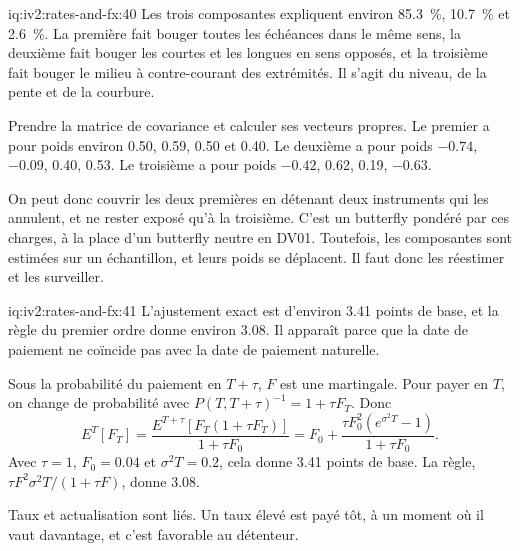 \begin{solution}{iq:iv2:rates-and-fx:40}
Les trois composantes expliquent environ 85.3~\%, 10.7~\% et 2.6~\%. La première fait bouger toutes les échéances dans le même sens, la deuxième fait bouger les courtes et les longues en sens opposés, et la troisième fait bouger le milieu à contre-courant des extrémités. Il s'agit du niveau, de la pente et de la courbure.

Prendre la matrice de covariance et calculer ses vecteurs propres. Le premier a pour poids environ 0.50, 0.59, 0.50 et 0.40. Le deuxième a pour poids $-0.74$, $-0.09$, 0.40, 0.53. Le troisième a pour poids $-0.42$, 0.62, 0.19, $-0.63$.

On peut donc couvrir les deux premières en détenant deux instruments qui les annulent, et ne rester exposé qu'à la troisième. C'est un butterfly pondéré par ces charges, à la place d'un butterfly neutre en DV01. Toutefois, les composantes sont estimées sur un échantillon, et leurs poids se déplacent. Il faut donc les réestimer et les surveiller.

\end{solution}

\begin{solution}{iq:iv2:rates-and-fx:41}
L'ajustement exact est d'environ 3.41 points de base, et la règle du premier ordre donne environ 3.08. Il apparaît parce que la date de paiement ne coïncide pas avec la date de paiement naturelle.

Sous la probabilité du paiement en $T + \tau$, $F$ est une martingale. Pour payer en $T$, on change de probabilité avec $P(T, T + \tau)^{-1} = 1 + \tau F_T$. Donc
\[
E^T[F_T] = \frac{E^{T+\tau}[F_T(1 + \tau F_T)]}{1 + \tau F_0} = F_0 + \frac{\tau F_0^2(e^{\sigma^2T} - 1)}{1 + \tau F_0}.
\]
Avec $\tau = 1$, $F_0 = 0.04$ et $\sigma^2T = 0.2$, cela donne 3.41 points de base. La règle, $\tau F^2\sigma^2T/(1 + \tau F)$, donne 3.08.

Taux et actualisation sont liés. Un taux élevé est payé tôt, à un moment où il vaut davantage, et c'est favorable au détenteur.

\end{solution}

